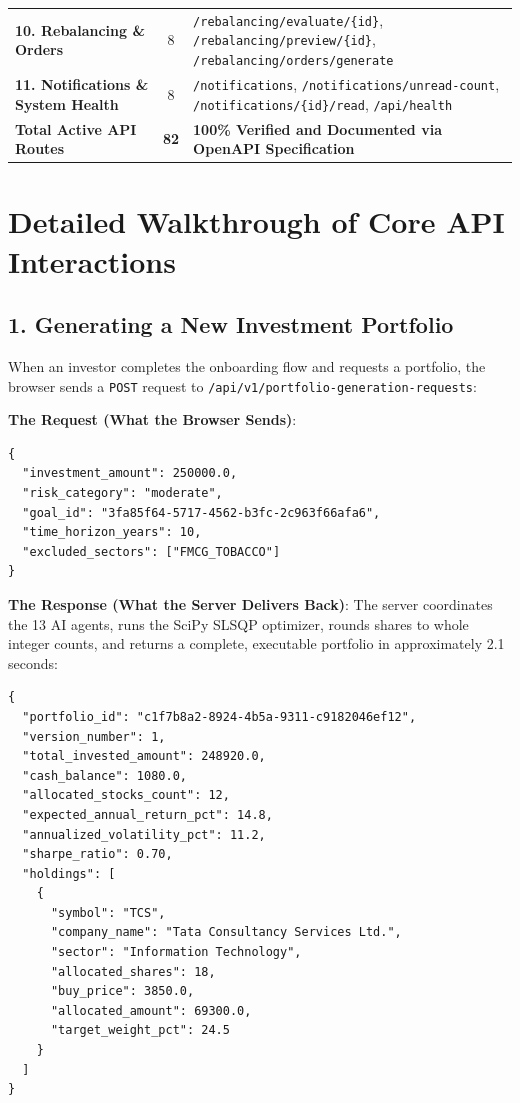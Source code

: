 \begin{table}[H]
{\begin{tabular}{lcl}
\textbf{10. Rebalancing \& Orders} & 8 & \texttt{/rebalancing/evaluate/\{id\}}, \texttt{/rebalancing/preview/\{id\}}, \texttt{/rebalancing/orders/generate} \\
\textbf{11. Notifications \& System Health} & 8 & \texttt{/notifications}, \texttt{/notifications/unread-count}, \texttt{/notifications/\{id\}/read}, \texttt{/api/health} \\
\bottomrule
\textbf{Total Active API Routes} & \textbf{82} & \textbf{100\% Verified and Documented via OpenAPI Specification} \\
\bottomrule
\end{tabular}%
}
\end{table}

\section{Detailed Walkthrough of Core API Interactions}

\subsection{1. Generating a New Investment Portfolio}
When an investor completes the onboarding flow and requests a portfolio, the browser sends a \texttt{POST} request to \texttt{/api/v1/portfolio-generation-requests}:

\noindent \textbf{The Request (What the Browser Sends)}:
\begin{footnotesize}
\begin{verbatim}
{
  "investment_amount": 250000.0,
  "risk_category": "moderate",
  "goal_id": "3fa85f64-5717-4562-b3fc-2c963f66afa6",
  "time_horizon_years": 10,
  "excluded_sectors": ["FMCG_TOBACCO"]
}
\end{verbatim}
\end{footnotesize}

\noindent \textbf{The Response (What the Server Delivers Back)}:
The server coordinates the 13 AI agents, runs the SciPy SLSQP optimizer, rounds shares to whole integer counts, and returns a complete, executable portfolio in approximately 2.1 seconds:
\begin{footnotesize}
\begin{verbatim}
{
  "portfolio_id": "c1f7b8a2-8924-4b5a-9311-c9182046ef12",
  "version_number": 1,
  "total_invested_amount": 248920.0,
  "cash_balance": 1080.0,
  "allocated_stocks_count": 12,
  "expected_annual_return_pct": 14.8,
  "annualized_volatility_pct": 11.2,
  "sharpe_ratio": 0.70,
  "holdings": [
    {
      "symbol": "TCS",
      "company_name": "Tata Consultancy Services Ltd.",
      "sector": "Information Technology",
      "allocated_shares": 18,
      "buy_price": 3850.0,
      "allocated_amount": 69300.0,
      "target_weight_pct": 24.5
    }
  ]
}
\end{verbatim}
\end{footnotesize}

